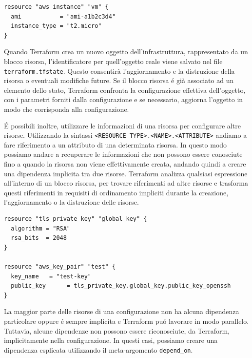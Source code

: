 \documentclass[12pt, a4paper, titlepage]{article}
\newenvironment{code}{\captionsetup{type=listing}}{}
\begin{document}
 \begin{code}
	\begin{verbatim}
resource "aws_instance" "vm" {
  ami           = "ami-a1b2c3d4"
  instance_type = "t2.micro"
}
	\end{verbatim}
\end{code}
\bigskip

Quando Terraform crea un nuovo oggetto dell'infrastruttura, rappresentato da un blocco risorsa, l'identificatore per quell'oggetto reale viene salvato nel file \texttt{terraform.tfstate}. Questo consentirà l'aggiornamento e la distruzione della risorsa o eventuali modifiche future. Se il blocco risorsa é già associato ad un elemento dello stato, Terraform confronta la configurazione effettiva dell'oggetto, con i parametri forniti dalla configurazione e se necessario, aggiorna l'oggetto in modo che corrisponda alla configurazione.

É possibili inoltre, utilizzare le informazioni di una risorsa per configurare altre risorse. Utilizzando la sintassi \texttt{<RESOURCE TYPE>.<NAME>.<ATTRIBUTE>} andiamo a fare riferimento a un attributo di una determinata risorsa. In questo modo possiamo andare a recuperare le informazioni che non possono essere conosciute fino a quando la risorsa non viene effettivamente creata, andando quindi a creare una dipendenza implicita tra due risorse. Terraform analizza qualsiasi espressione all'interno di un blocco risorsa, per trovare riferimenti ad altre risorse e trasforma questi riferimenti in requisiti di ordinamento impliciti durante la creazione, l'aggiornamento o la distruzione delle risorse. 

 \begin{code}
	\begin{verbatim}
resource "tls_private_key" "global_key" {
  algorithm = "RSA"
  rsa_bits  = 2048
}
	
resource "aws_key_pair" "test" {
  key_name   = "test-key"
  public_key      = tls_private_key.global_key.public_key_openssh
}
	\end{verbatim}
\end{code}
\bigskip
La maggior parte delle risorse di una configurazione non ha alcuna dipendenza particolare oppure é sempre implicita e Terraform puó lavorare in modo parallelo. Tuttavia, alcune dipendenze non possono essere riconosciute, da Terraform, implicitamente nella configurazione. In questi casi, possiamo creare una dipendenza esplicata utilizzando il meta-argomento \texttt{depend\_on}.
\end{document}
